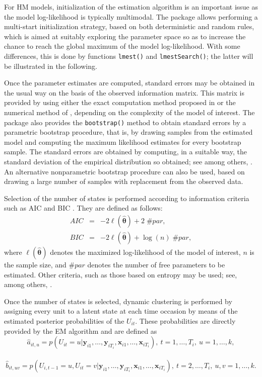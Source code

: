 For HM models, initialization of the estimation algorithm is an
important issue as the model log-likelihood is typically multimodal. The
 package allows performing a multi-start initialization
strategy, based on both deterministic and random rules, which is aimed
at suitably exploring the parameter space so as to increase the chance
to reach the global maximum of the model log-likelihood. With some
differences, this is done by functions \texttt{lmest()} and \texttt{lmestSearch()};
the latter will be illustrated in the following.

Once the parameter estimates are computed, standard errors may be
obtained in the usual way on the basis of the observed information
matrix. This matrix is provided by  using either the
exact computation method proposed in \cite{bart:farc:15a} or the
numerical method of \cite{bart:farc:09}, depending on the complexity of
the model of interest. The package also provides the \texttt{bootstrap()}
method to obtain standard errors by a parametric bootstrap procedure,
that is, by drawing samples from the estimated model and computing the
maximum likelihood estimates for every bootstrap sample. The standard
errors are obtained by computing, in a suitable way, the standard
deviation of the empirical distribution so obtained; see among others,
\cite{viss:spee:22}. An alternative nonparametric bootstrap procedure
can also be used, based on drawing a large number of samples with
replacement from the observed data.

Selection of the number of states is performed according to information
criteria such as AIC \citep{aka:73} and BIC \citep{sch:78}. They are
defined as follows:
\begin{eqnarray*}
AIC &=& -2 {\ell}(\boldsymbol{\hat{\theta}}) + 2 \;\#par,\\
BIC &=& -2 {\ell}(\boldsymbol{\hat{\theta}}) + \log(n)\;\#par,
\end{eqnarray*}
where \({\ell}(\boldsymbol{\hat{\theta}})\) denotes the maximized log-likelihood
of the model of interest, \(n\) is the sample size, and \(\#par\) denotes
the number of free parameters to be estimated. Other criteria, such as
those based on entropy may be used; see, among others,
\cite{bacc:pand:penn:14}.

Once the number of states is selected, dynamic clustering is performed
by assigning every unit to a latent state at each time occasion by means
of the estimated posterior probabilities of the \(U_{it}\). These
probabilities are directly provided by the EM algorithm and are defined
as \begin{equation}
\hat{a}_{it,u} = p(U_{it}=u | \boldsymbol{y}_{i1},\ldots, \boldsymbol{y}_{iT_i},\mathbf{x}_{i1},\ldots,\boldsymbol{x}_{iT_i}), \: t=1,\ldots,T_i, \: u = 1,\ldots,k, \label{eq:postprob}
\end{equation}\\
\[
\hat{b}_{it,uv} = p(U_{i,t-1}=u, U_{it}=v | \boldsymbol{y}_{i1},\ldots,\boldsymbol{y}_{iT_i},\boldsymbol{x}_{i1},\ldots,\boldsymbol{x}_{iT_i}), \: t=2,\ldots,T_i, \: u,v = 1,\ldots,k. \label{eq:postprob2}
\]

